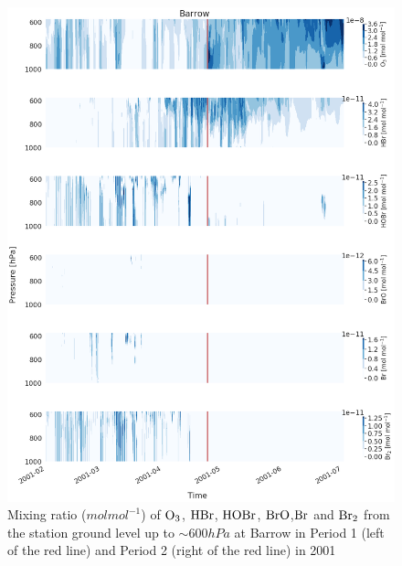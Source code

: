 \begin{figure}[h]
    \centering
    \includegraphics[width=\linewidth]{Chapter6_Results/images/Vert_StationComp_2001/vert_all_species_BRW.png}
    \caption{Mixing ratio ($mol mol^{-1}$) of $\mathrm{O_3}$, $\mathrm{HBr}$, $\mathrm{HOBr}$, $\mathrm{BrO}$,$\mathrm{Br}$ and $\mathrm{Br_2}$ from the station ground level up to $\sim 600 hPa$ at Barrow in Period 1 (left of the red line) and Period 2 (right of the red line) in 2001}
    \label{fig:vert_BRW}
\end{figure}